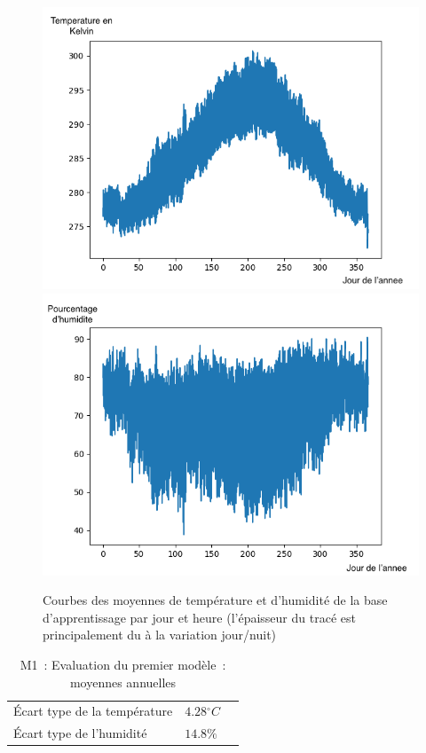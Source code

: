 \documentclass[11pt,a4paper]{article}
\begin{document}
\begin{figure} [!h]
\centering
\includegraphics[width=0.48 \textwidth]{./imagesTIPE/moyenneT.png}\quad
\includegraphics[width=0.48 \textwidth]{./imagesTIPE/moyenneH.png}
\caption{\label{fig:xxx} Courbes des moyennes de température et d'humidité de la base d'apprentissage par jour et heure (l'épaisseur du tracé est principalement du à la variation jour/nuit)}
\end{figure}
\begin{table}[h]
\begin{center}
\begin{tabular}{lll}\hline
\hline
Écart type de la température& $4.28{}^{\circ}C$\\
Écart type de l'humidité       &  $ 14.8\% $\\
\hline 
\end{tabular}
\caption{M1~: Evaluation du premier modèle~: moyennes annuelles}\label{tab:premModele}
\end{center}
\end{table}
\end{document}

